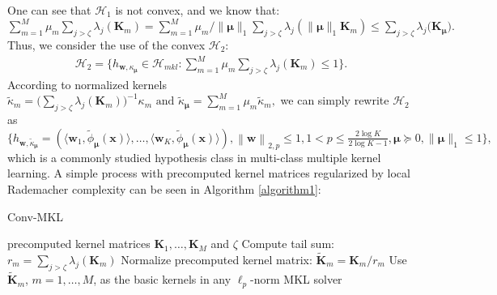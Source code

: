 \documentclass{article}
\begin{document}
One can see that $\mathcal{H}_{1}$ is not convex, and we know that:
$
        \sum_{m=1}^M\mu_m\sum_{j>\zeta}\lambda_{j}(\mathbf{K}_m)
         =\sum_{m=1}^M\mu_m/\|\bm \mu\|_1 \sum_{j>\zeta}\lambda_{j}(\|\bm \mu\|_1\mathbf{K}_m)
         \leq \sum_{j>\zeta} \lambda_j\big(\mathbf{K}_{\bm \mu}\big).
$
Thus, we consider the use of the convex $\mathcal{H}_2$:
\begin{align*}
    \mathcal{H}_{2}=\Big\{h_{\mathbf{w}, \kappa_{\bm \mu}} \in \mathcal{H}_{mkl}:
    \sum_{m=1}^M\mu_m\sum_{j>\zeta}\lambda_{j}(\mathbf{K}_m) \leq 1\Big\}.
\end{align*}
According to normalized kernels
$
    \tilde{\kappa}_m=\Big(\sum_{j>\zeta}\lambda_j(\mathbf K_m)\Big)^{-1}\kappa_m
    \text{ and }
    \tilde{\kappa}_{\bm \mu}=\sum_{m=1}^M\mu_m\tilde{\kappa}_m,
$
we can simply rewrite $\mathcal{H}_2$ as
$
   \Big\{h_{\mathbf{w},\tilde{\kappa}_{\bm \mu}}=\left(\langle \mathbf w_1,\tilde{\phi}_{\bm \mu}(\mathbf x)\rangle,
   \ldots, \langle\mathbf w_K,\tilde{\phi}_{\bm \mu}(\mathbf x)\rangle\right),
   \left\|\mathbf  w \right\|_{2,p}\leq 1, 1 < p \leq \frac{2\log K}{2\log K-1},
   \bm \mu\succeq 0,\|\bm \mu\|_1 \leq 1\Big\},
$
which is a commonly studied hypothesis class in multi-class multiple kernel learning.
A simple process with precomputed kernel matrices regularized by local Rademacher complexity can be seen in Algorithm  \ref{algorithm1}:
\begin{algorithm}[h]
   \caption{Conv-MKL}
   \label{algorithm1}
    \begin{algorithmic}
        precomputed kernel matrices $\mathbf{K}_1,\ldots,\mathbf{K}_M$ and $\zeta$
        \STATE Compute tail sum: $r_m=\sum_{j>\zeta}\lambda_j\left(\mathbf{K}_m\right)$
        \STATE Normalize precomputed kernel matrix: $\widetilde{\mathbf{K}}_m=\mathbf{K}_m/r_m$
       \ENDFOR
       \STATE Use $\widetilde{\mathbf{K}}_m$, $m=1,\ldots, M$, as the basic kernels in any $\ell_p$-norm MKL solver
    \end{algorithmic}
\end{algorithm}
\end{document}
